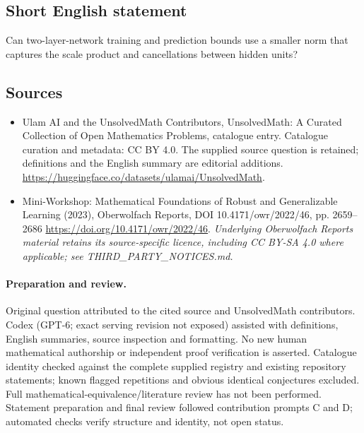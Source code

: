 \documentclass[11pt]{article}
\begin{document}
\subsection{Short English statement}
Can two-layer-network training and prediction bounds use a smaller norm that captures the scale product and cancellations between hidden units?
\subsection{Sources}
\begin{itemize}
\item[\hypertarget{source:statement:1}{S1}] Ulam AI and the UnsolvedMath Contributors, UnsolvedMath: A Curated Collection of Open Mathematics Problems, catalogue entry. Catalogue curation and metadata: CC BY 4.0. The supplied source question is retained; definitions and the English summary are editorial additions.
\url{https://huggingface.co/datasets/ulamai/UnsolvedMath}.
\item[\hypertarget{source:statement:2}{S2}] Mini-Workshop: Mathematical Foundations of Robust and Generalizable Learning (2023), Oberwolfach Reports, DOI 10.4171/owr/2022/46, pp. 2659--2686
\url{https://doi.org/10.4171/owr/2022/46}.
\textit{Underlying Oberwolfach Reports material retains its source-specific licence, including CC BY-SA 4.0 where applicable; see THIRD\_PARTY\_NOTICES.md.}
\end{itemize}
\paragraph{Preparation and review.}
Original question attributed to the cited source and UnsolvedMath contributors. Codex (GPT-6; exact serving revision not exposed) assisted with definitions, English summaries, source inspection and formatting. No new human mathematical authorship or independent proof verification is asserted. Catalogue identity checked against the complete supplied registry and existing repository statements; known flagged repetitions and obvious identical conjectures excluded. Full mathematical-equivalence/literature review has not been performed. Statement preparation and final review followed contribution prompts C and D; automated checks verify structure and identity, not open status.
\label{end:statement}
\end{document}
